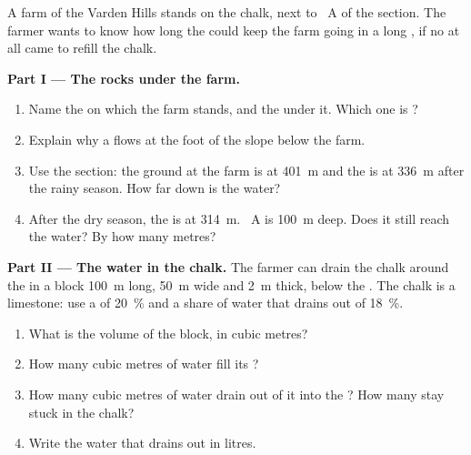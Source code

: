 \begin{problem}
\label{pb:g6:water-underground:1}
A farm of the Varden Hills stands on the chalk, next to ~A of the
section. The farmer wants to know how long the  could keep the farm
going in a long , if no  at all came to refill the chalk.

\medskip
\noindent\textbf{Part I --- The rocks under the farm.}
\begin{enumerate}
  \item Name the  on which the farm stands, and the  under it. Which
        one is ?
  \item Explain why a  flows at the foot of the slope below the farm.
  \item Use the section: the ground at the farm is at 401~m and the  is at 336~m after the rainy season. How far down is the water?
  \item After the dry season, the  is at 314~m. ~A is
        100~m deep. Does it still reach the water? By how many metres?
\end{enumerate}

\medskip
\noindent\textbf{Part II --- The water in the chalk.}
The farmer can drain the chalk around the  in a block 100~m long,
50~m wide and 2~m thick, below the . The chalk is a limestone:
use a  of 20~\% and a share of water that drains out of 18~\%.
\begin{enumerate}[resume]
  \item What is the volume of the block, in cubic metres?
  \item How many cubic metres of water fill its ?
  \item How many cubic metres of water drain out of it into the ? How
        many stay stuck in the chalk?
  \item Write the water that drains out in litres.
\end{enumerate}


\end{problem}
